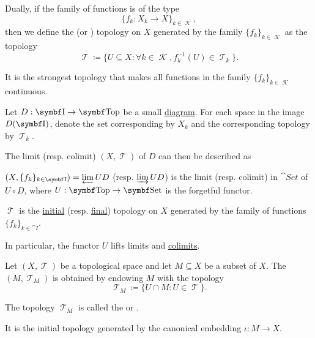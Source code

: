 \begin{definition}\label{def:final_topology}\mcite\cite{nLab:top}
  Dually, if the family of functions is of the type
  \begin{equation*}
    \{ f_k: X_k \to X \}_{k \in \mscrK},
  \end{equation*}
  then we define the  (or ) topology on \( X \) generated by the family \( \{ f_k \}_{k \in \mscrK} \) as the topology
  \begin{equation*}
    \mscrT \coloneqq \{ U \subseteq X \colon \forall k \in \mscrK, f_k^{-1}(U) \in \mscrT_k \}.
  \end{equation*}

  It is the strongest topology that makes all functions in the family \( \{ f_k \}_{k \in \mscrK} \) continuous.
\end{definition}

\begin{proposition}\label{thm:initial_final_topology_limit}\mcite\cite{nLab:top}
  Let \( D: \bfop I \to \cat{Top} \) be a small \hyperref[def:categorical_diagram]{diagram}. For each space in the image \( D(\bfop I) \), denote the set corresponding by \( X_k \) and the corresponding topology by \( \mscrT_k \).

  The limit (resp. colimit) \( (X, \mscrT) \) of \( D \) can then be described as
  \begin{defenum}
    \item \( (X, \{ f_k \}_{k \in \cat{I}}) = \varprojlim UD \) (resp. \( \varinjlim UD \)) is the limit (resp. colimit) in \( \cat{Set} \) of \( U \circ D \), where \( U: \bfop{Top} \to \cat{Set} \) is the forgetful functor.
    \item \( \mscrT \) is the \hyperref[def:initial_topology]{initial} (resp. \hyperref[def:final_topology]{final}) topology on \( X \) generated by the family of functions \( \{ f_k \}_{k \in \cat{I}} \).
  \end{defenum}

  In particular, the functor \( U \) lifts limits and \hyperref[def:categorical_limit_preservation/lift]{colimits}.
\end{proposition}

\begin{definition}\label{def:topological_subspace}
  Let \( (X, \mscrT) \) be a topological space and let \( M \subseteq X \) be a subset of \( X \). The  \( (M, \mscrT_M) \) is obtained by endowing \( M \) with the topology
  \begin{equation*}
    \mscrT_M \coloneqq \{ U \cap M \colon U \in \mscrT \}.
  \end{equation*}

  The topology \( \mscrT_M \) is called the  or .

  It is the initial topology generated by the canonical embedding \( \iota: M \to X \).
\end{definition}

